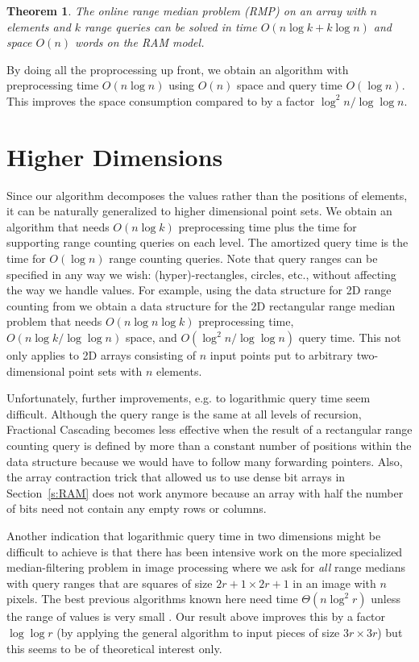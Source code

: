 \documentclass[a4paper,10pt]{article}
\newtheorem{theorem}{Theorem}
\newcommand{\Th}[1]{\Theta\!\left( #1\right)}
\begin{document}
\begin{theorem}
  The online range median problem (RMP) on an array with $n$ elements
  and $k$ range queries can be solved in time $O(n\log k + k\log n)$ and
  space $O(n)$ words on the RAM model.
\end{theorem}

By doing all the proprocessing up front, we obtain an algorithm
with preprocessing time $O(n\log n)$ using $O(n)$ space and query time $O(\log n)$.
This improves the space consumption compared to \cite{DBLP:journals/njc/KrizancMS05} by a factor $\log^2 n/\log\log n$. 



\section{Higher Dimensions}\label{s:highd}

Since our algorithm decomposes the values rather than the positions of
elements, it can be naturally generalized to higher dimensional point
sets. We obtain an algorithm that needs $O(n\log k)$ preprocessing
time plus the time for supporting range counting queries on each
level.  The amortized query time is the time for $O(\log n)$ range
counting queries.  Note that query ranges can be specified in any way
we wish: (hyper)-rectangles, circles, etc., without affecting the way
we handle values.  For example, using the
data structure for 2D range counting from \cite{DBLP:conf/isaac/JaJaMS04} we obtain a
data structure for the 2D rectangular range median problem that needs
$O(n\log n\log k)$ preprocessing time, $O(n\log k/\log\log n)$ space, and
$O(\log^2n/\log\log n)$ query time. This not only applies to 2D arrays consisting
of $n$ input points put to arbitrary two-dimensional point sets with
$n$ elements.  

Unfortunately, further improvements, e.g. to logarithmic query time
seem difficult. Although the query range is the same at all levels of
recursion, Fractional Cascading becomes less effective when the result of a
rectangular range counting query is defined by more than a constant
number of positions within the data structure because we would
have to follow many forwarding pointers.  Also, the
array contraction trick that allowed us to use 
dense bit arrays
in Section~\ref{s:RAM} does not work anymore because an array with
half the number of bits need not contain any empty rows or columns.

Another indication that logarithmic query time in two dimensions might
be difficult to achieve is that there has been intensive work on the
more specialized median-filtering problem in image processing where we
ask for \emph{all} range medians with query ranges that are squares of
size $2r+1\times 2r+1$ in an image with $n$ pixels. The best previous algorithms known here need
time $\Th{n\log^2 r}$\cite{GilWerman} unless the range of values is very small
\cite{2Dmedian1,2Dmedian2}. Our result above improves this by a factor $\log\log r$ 
(by applying the general algorithm to input pieces of size $3r\times 3r$) but this
seems to be of theoretical interest only.
\end{document}

